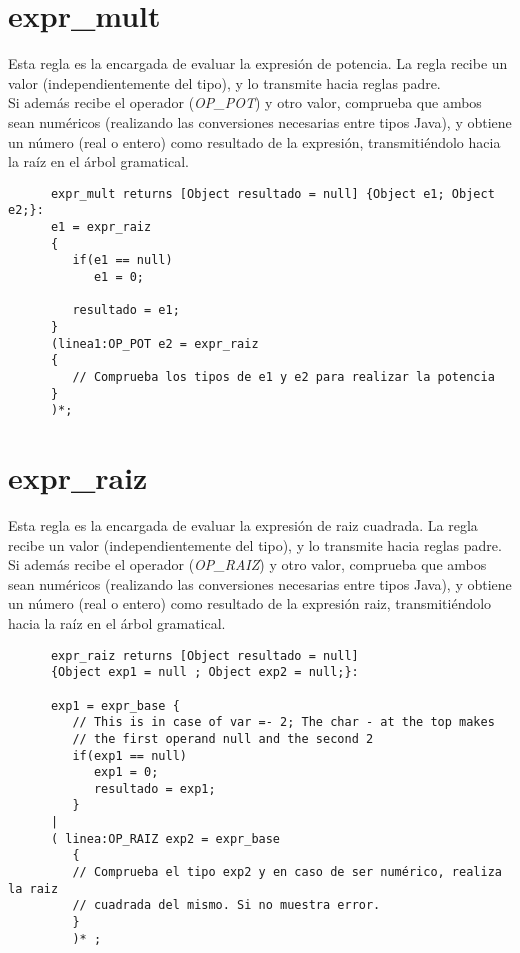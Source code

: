    \section{expr\_mult}
   Esta regla es la encargada de evaluar la expresión de potencia. La regla recibe un valor (independientemente del tipo), y
   lo transmite hacia reglas padre.\\

   Si además recibe el operador (\textit{OP\_POT}) y otro valor, comprueba que ambos sean numéricos (realizando las conversiones necesarias
   entre tipos Java), y obtiene un número (real o entero) como resultado de la expresión, transmitiéndolo hacia la raíz en el árbol
   gramatical. 
   \begin{lstlisting}
      expr_mult returns [Object resultado = null] {Object e1; Object e2;}:
      e1 = expr_raiz
      {
         if(e1 == null)
            e1 = 0;
            
         resultado = e1; 
      }
      (linea1:OP_POT e2 = expr_raiz
      {
         // Comprueba los tipos de e1 y e2 para realizar la potencia 
      }
      )*;
   \end{lstlisting}

   \section{expr\_raiz}
   Esta regla es la encargada de evaluar la expresión de raiz cuadrada. La regla recibe un valor (independientemente del tipo), 
   y lo transmite hacia reglas padre. \\

   Si además recibe el operador (\textit{OP\_RAIZ}) y otro valor, comprueba que ambos sean numéricos (realizando las conversiones necesarias
   entre tipos Java), y obtiene un número (real o entero) como resultado de la expresión raiz, transmitiéndolo hacia la raíz en el
   árbol gramatical. 
   \begin{lstlisting}
      expr_raiz returns [Object resultado = null]
      {Object exp1 = null ; Object exp2 = null;}: 

      exp1 = expr_base {
         // This is in case of var =- 2; The char - at the top makes 
         // the first operand null and the second 2
         if(exp1 == null)
            exp1 = 0; 
            resultado = exp1;
         }
      |
      ( linea:OP_RAIZ exp2 = expr_base
         {
         // Comprueba el tipo exp2 y en caso de ser numérico, realiza la raiz 
         // cuadrada del mismo. Si no muestra error.
         }
         )* ;
   \end{lstlisting}

